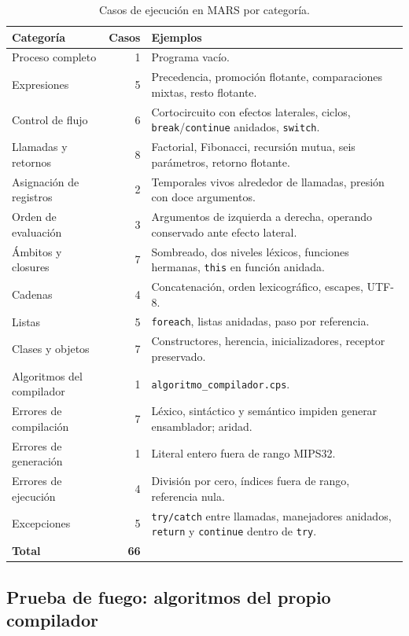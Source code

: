 \documentclass[11pt,a4paper]{article}
\begin{document}
\begin{table}[H]
\centering
\small
\begin{tabular}{@{}L{4.6cm}rL{8.0cm}@{}}
\toprule
\textbf{Categoría} & \textbf{Casos} & \textbf{Ejemplos} \\
\midrule
Proceso completo & 1 & Programa vacío. \\
Expresiones & 5 & Precedencia, promoción flotante, comparaciones mixtas, resto
flotante. \\
Control de flujo & 6 & Cortocircuito con efectos laterales, ciclos,
\texttt{break}/\texttt{continue} anidados, \texttt{switch}. \\
Llamadas y retornos & 8 & Factorial, Fibonacci, recursión mutua, seis
parámetros, retorno flotante. \\
Asignación de registros & 2 & Temporales vivos alrededor de llamadas, presión
con doce argumentos. \\
Orden de evaluación & 3 & Argumentos de izquierda a derecha, operando
conservado ante efecto lateral. \\
Ámbitos y closures & 7 & Sombreado, dos niveles léxicos, funciones hermanas,
\texttt{this} en función anidada. \\
Cadenas & 4 & Concatenación, orden lexicográfico, escapes, UTF-8. \\
Listas & 5 & \texttt{foreach}, listas anidadas, paso por referencia. \\
Clases y objetos & 7 & Constructores, herencia, inicializadores, receptor
preservado. \\
Algoritmos del compilador & 1 & \texttt{algoritmo\_compilador.cps}. \\
Errores de compilación & 7 & Léxico, sintáctico y semántico impiden generar
ensamblador; aridad. \\
Errores de generación & 1 & Literal entero fuera de rango MIPS32. \\
Errores de ejecución & 4 & División por cero, índices fuera de rango, referencia
nula. \\
Excepciones & 5 & \texttt{try/catch} entre llamadas, manejadores anidados,
\texttt{return} y \texttt{continue} dentro de \texttt{try}. \\
\midrule
\textbf{Total} & \textbf{66} & \\
\bottomrule
\end{tabular}
\caption{Casos de ejecución en MARS por categoría.}
\end{table}

\subsection{Prueba de fuego: algoritmos del propio compilador}
\end{document}
